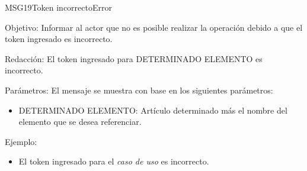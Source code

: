 \begin{mensaje}{MSG19}{Token incorrecto}{Error}
	\item [Objetivo:] Informar al actor que no es posible realizar la operación debido a que el token ingresado es incorrecto.
	\item[Redacción:] El token ingresado para DETERMINADO ELEMENTO es incorrecto.
	\item[Parámetros:] El mensaje se muestra con base en los siguientes parámetros:
	\begin{itemize}
		\item DETERMINADO ELEMENTO: Artículo determinado más el nombre del elemento que se desea referenciar.
	\end{itemize}
	\item[Ejemplo:] \begin{itemize}
		\item El token ingresado para el {\em caso de uso} es incorrecto.
	\end{itemize}
\end{mensaje}
